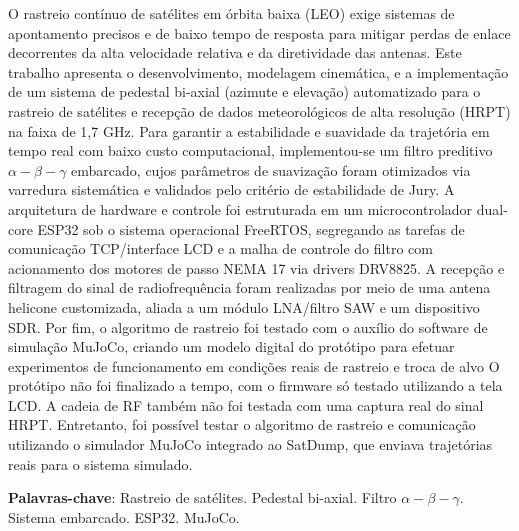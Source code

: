 
\setlength{\absparsep}{18pt} %
\begin{resumo}
  O rastreio contínuo de satélites em órbita baixa (LEO) exige sistemas de apontamento precisos e de baixo tempo de resposta para mitigar perdas de enlace decorrentes da alta velocidade relativa e da diretividade das antenas.
  Este trabalho apresenta o desenvolvimento, modelagem cinemática, e a implementação de um sistema de pedestal bi-axial (azimute e elevação) automatizado para o rastreio de satélites e recepção de dados meteorológicos de alta resolução (HRPT) na faixa de 1,7 GHz.
  Para garantir a estabilidade e suavidade da trajetória em tempo real com baixo custo computacional, implementou-se um filtro preditivo $\alpha-\beta-\gamma$ embarcado, cujos parâmetros de suavização foram otimizados via varredura sistemática e validados pelo critério de estabilidade de Jury.
  A arquitetura de hardware e controle foi estruturada em um microcontrolador dual-core ESP32 sob o sistema operacional FreeRTOS, segregando as tarefas de comunicação TCP/interface LCD e a malha de controle do filtro com acionamento dos motores de passo NEMA 17 via drivers DRV8825.
  A recepção e filtragem do sinal de radiofrequência foram realizadas por meio de uma antena helicone customizada, aliada a um módulo LNA/filtro SAW e um dispositivo SDR.
  Por fim, o algoritmo de rastreio foi testado com o auxílio do software de simulação MuJoCo, criando um modelo digital do protótipo para efetuar experimentos de funcionamento em condições reais de rastreio e troca de alvo
  O protótipo não foi finalizado a tempo, com o firmware só testado utilizando a tela LCD. A cadeia de RF também não foi testada com uma captura real do sinal HRPT.
  Entretanto, foi possível testar o algoritmo de rastreio e comunicação utilizando o simulador MuJoCo integrado ao SatDump, que enviava trajetórias reais para o sistema simulado.

  \vspace{\onelineskip}
  \textbf{Palavras-chave}: Rastreio de satélites. Pedestal bi-axial. Filtro $\alpha-\beta-\gamma$. Sistema embarcado. ESP32. MuJoCo.
\end{resumo}

